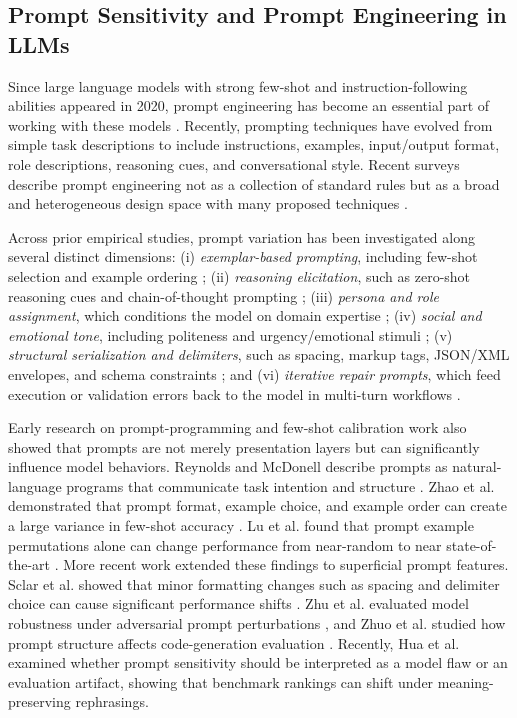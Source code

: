 \documentclass[a4paper,fleqn]{cas-sc}
\begin{document}
\subsection{Prompt Sensitivity and Prompt Engineering in
LLMs}\label{prompt-sensitivity-and-prompt-engineering-in-llms}

Since large language models with strong few-shot and instruction-following abilities appeared in 2020, prompt engineering has become an essential part of working with these models \citep{brown2020fewshot}. Recently, prompting techniques have evolved from simple task descriptions to include instructions, examples, input/output format, role descriptions, reasoning cues, and conversational style. Recent surveys describe prompt engineering not as a collection of standard rules but as a broad and heterogeneous design space with many proposed techniques \citep{schulhoff2024promptreport}.

Across prior empirical studies, prompt variation has been investigated along several distinct dimensions: (i) \emph{exemplar-based prompting}, including few-shot selection and example ordering \citep{brown2020fewshot, zhao2021calibrate, lu2021fantastically}; (ii) \emph{reasoning elicitation}, such as zero-shot reasoning cues and chain-of-thought prompting \citep{wei2022cot, kojima2022zeroshot}; (iii) \emph{persona and role assignment}, which conditions the model on domain expertise \citep{schulhoff2024promptreport, zhuo2024prosa}; (iv) \emph{social and emotional tone}, including politeness and urgency/emotional stimuli \citep{li2023emotionprompt, yin2024politeness}; (v) \emph{structural serialization and delimiters}, such as spacing, markup tags, JSON/XML envelopes, and schema constraints \citep{sclar2023spurious, liu2024structuredoutput}; and (vi) \emph{iterative repair prompts}, which feed execution or validation errors back to the model in multi-turn workflows \citep{jimenez2024swebench}.

Early research on prompt-programming and few-shot calibration work also showed that prompts are not merely presentation layers but can significantly influence model behaviors. Reynolds and McDonell describe prompts as natural-language programs that communicate task intention and structure \citep{reynolds2021promptprogramming}. Zhao et al. demonstrated that prompt format, example choice, and example order can create a large variance in few-shot accuracy \citep{zhao2021calibrate}. Lu et al. found that prompt example permutations alone can change performance from near-random to near state-of-the-art \citep{lu2021fantastically}. More recent work extended these findings to superficial prompt features. Sclar et al. showed that minor formatting changes such as spacing and delimiter choice can cause significant performance shifts \citep{sclar2023spurious}. Zhu et al. evaluated model robustness under adversarial prompt perturbations \citep{zhu2023promptrobust}, and Zhuo et al. studied how prompt structure affects code-generation evaluation \citep{zhuo2024prosa}. Recently, Hua et al.\ \citep{hua2025promptartifact} examined whether prompt sensitivity should be interpreted as a model flaw or an evaluation artifact, showing that benchmark rankings can shift under meaning-preserving rephrasings.
\end{document}
